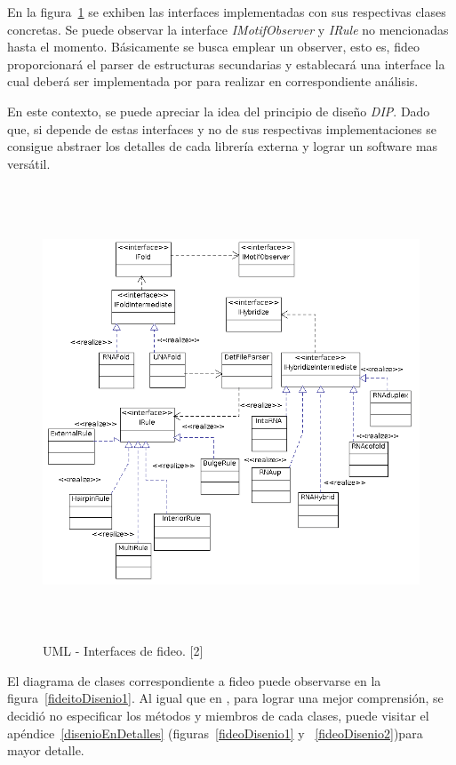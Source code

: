 En la figura~\ref{interfaceFideo} se exhiben las interfaces implementadas con sus respectivas clases concretas. Se puede observar la interface \emph{IMotifObserver} y \emph{IRule} no mencionadas hasta el momento. Básicamente se busca emplear un observer, esto es, fideo proporcionará el parser de estructuras secundarias y establecará una interface la cual deberá ser implementada por \remo para realizar en correspondiente análisis.

\par En este contexto, se puede apreciar la idea del principio de diseño \emph{DIP}. Dado que, si \remo depende de estas interfaces y no de sus respectivas implementaciones se consigue abstraer los detalles de cada librería externa y lograr un software mas versátil. 

\begin{figure}[!hbtp]
	\begin{center}
		\includegraphics[width=15cm, height=13.5cm]{image/fideoInterface.png}
		\caption{UML - Interfaces de fideo. [2]}
		\label{interfaceFideo} 
	\end{center}
\end{figure}

\par El diagrama de clases correspondiente a fideo puede observarse en la figura~\ref{fideitoDisenio1}. Al igual que en \remo, para lograr una mejor comprensión, se decidió no especificar los métodos y miembros de cada clases, puede visitar el apéndice~\ref{disenioEnDetalles} (figuras~\ref{fideoDisenio1} y ~\ref{fideoDisenio2})para mayor detalle.

